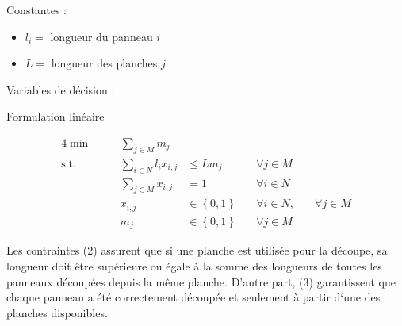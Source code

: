 \documentclass{article}[A4]
\begin{document}
Constantes :
\begin{itemize}
    \item[] $l_{i} =$ longueur du panneau $i$
    \item[] $L =$ longueur des planches $j$
\end{itemize}

Variables de décision :
\begin{algorithm}[H]
\caption{Formulation linéaire}
\begin{alignat}{4}
    \min        &\quad& \sum\limits_{j \in M} m_{j}                        &                                   &\\
	\text{s.t.} &\quad& \sum\limits_{i \in N} l_{i} x_{i,j}                &\leq L m_{j}                       &\quad\forall j \in M\\ 
                &\quad& \sum\limits_{j \in M} x_{i,j}                      & = 1                               &\quad\forall i \in N\\
                &\quad& x_{i,j}                                            &\in \left\{0, 1\right\}            &\quad\forall i \in N, 	&\quad\forall j \in M\\
                &\quad& m_{j}                                              &\in \left\{0, 1\right\}            &\quad\forall j \in M
\end{alignat}
\end{algorithm}

Les contraintes (2) assurent que si une planche est utilisée pour la 
découpe, sa longueur doit être supérieure ou égale à la somme des 
longueurs de toutes les panneaux découpées depuis la même planche. 
D'autre part, (3) garantissent que chaque panneau a été correctement 
découpée et seulement à partir d`une des planches disponibles.
\end{document}
